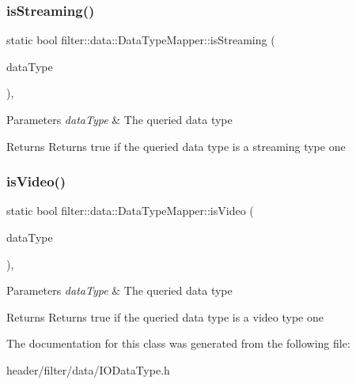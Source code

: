 \subsubsection{\texorpdfstring{is\+Streaming()}{isStreaming()}}
{\footnotesize\ttfamily static bool filter\+::data\+::\+Data\+Type\+Mapper\+::is\+Streaming (\begin{DoxyParamCaption}\item[{const I\+O\+Data\+Type \&}]{data\+Type }\end{DoxyParamCaption})\hspace{0.3cm}{\ttfamily [inline]}, {\ttfamily [static]}}


\begin{DoxyParams}{Parameters}
{\em data\+Type} & The queried data type \\
\hline
\end{DoxyParams}
\begin{DoxyReturn}{Returns}
Returns true if the queried data type is a streaming type one 
\end{DoxyReturn}
\mbox{\label{classfilter_1_1data_1_1_data_type_mapper_ae21733c90e100f82c69455bc3ae1f2e2}} 
\subsubsection{\texorpdfstring{is\+Video()}{isVideo()}}
{\footnotesize\ttfamily static bool filter\+::data\+::\+Data\+Type\+Mapper\+::is\+Video (\begin{DoxyParamCaption}\item[{const I\+O\+Data\+Type \&}]{data\+Type }\end{DoxyParamCaption})\hspace{0.3cm}{\ttfamily [inline]}, {\ttfamily [static]}}


\begin{DoxyParams}{Parameters}
{\em data\+Type} & The queried data type \\
\hline
\end{DoxyParams}
\begin{DoxyReturn}{Returns}
Returns true if the queried data type is a video type one 
\end{DoxyReturn}


The documentation for this class was generated from the following file\+:\begin{DoxyCompactItemize}
\item 
header/filter/data/I\+O\+Data\+Type.\+h\end{DoxyCompactItemize}
